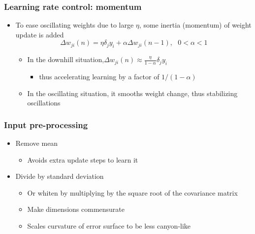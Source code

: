\documentclass[12pt,notes,mathserif]{beamer}
\begin{document}
\begin{frame}[c]
	\frametitle{Learning rate control: momentum}
	\begin{itemize}
		\item To ease oscillating weights due to large $\eta$, some inertia (momentum) of weight update is added
		      \[
			      \Delta w_{ji}(n)=\eta \delta_jy_i+\alpha\Delta w_{ji}(n-1), ~~~0<\alpha<1
		      \]\vspace*{-5mm}
		      \begin{itemize}
			      \item In the downhill situation,$\Delta w_{ji}(n)\approx \frac{\eta}{1-\alpha}\delta_jy_i$
			            \begin{itemize}
				            \item  thus accelerating learning by a factor of $1/(1-\alpha)$

			            \end{itemize}
			      \item In the oscillating situation, it smooths weight change, thus stabilizing oscillations

		      \end{itemize}
	\end{itemize}
\end{frame}
\begin{frame}[c]
	\frametitle{Input pre-processing}
	\begin{itemize}
		\item Remove mean
		      \begin{itemize}
			      \item  Avoids extra update steps to learn it

		      \end{itemize}
		\item Divide by standard deviation
		      \begin{itemize}
			      \item Or whiten by multiplying by the square root of the covariance matrix

			      \item Make dimensions commensurate

			      \item Scales curvature of error surface to be less canyon-like

		      \end{itemize}

	\end{itemize}

\end{frame}
\end{document}

